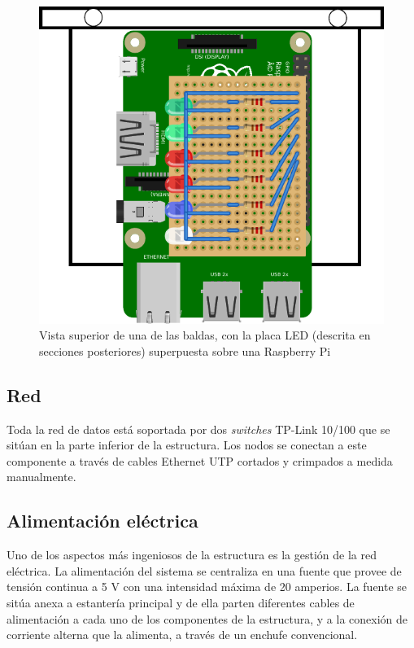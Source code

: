 \documentclass{article}
\begin{document}
\begin{figure}[H]
\centering
\includegraphics[height=0.3\textheight]{planos/placa}
\caption{Vista superior de una de las baldas, con la placa LED (descrita en secciones posteriores) superpuesta sobre una Raspberry Pi}
\end{figure}

\subsection{Red}

Toda la red de datos está soportada por dos \textit{switches} TP-Link 10/100 que se sitúan en la parte inferior de la estructura. Los nodos se conectan a este componente a través de cables Ethernet UTP cortados y crimpados a medida manualmente.

\subsection{Alimentación eléctrica}

Uno de los aspectos más ingeniosos de la estructura es la gestión de la red eléctrica. La alimentación del sistema se centraliza en una fuente que provee de tensión continua a 5 V con una intensidad máxima de 20 amperios. La fuente se sitúa anexa a estantería principal y de ella parten diferentes cables de alimentación a cada uno de los componentes de la estructura, y a la conexión de corriente alterna que la alimenta, a través de un enchufe convencional.
\end{document}
